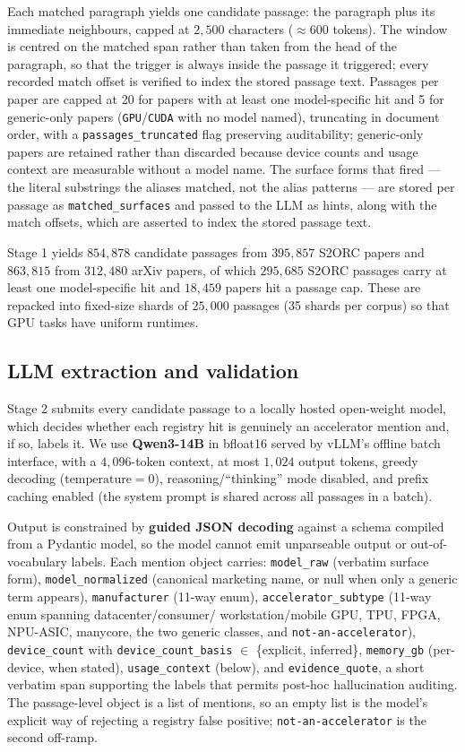 Each matched paragraph yields one candidate passage: the paragraph plus its
immediate neighbours, capped at $2{,}500$ characters ($\approx 600$ tokens). The
window is centred on the matched span rather than taken from the head of the
paragraph, so that the trigger is always inside the passage it triggered; every
recorded match offset is verified to index the stored passage text. Passages per
paper are capped at 20 for papers with at least one model-specific hit and 5 for
generic-only papers (\texttt{GPU}/\texttt{CUDA} with no model named), truncating
in document order, with a
\texttt{passages\_truncated} flag preserving auditability; generic-only papers
are retained rather than discarded because device counts and usage context are
measurable without a model name. The surface forms that fired --- the literal
substrings the aliases matched, not the alias patterns --- are stored per passage
as \texttt{matched\_surfaces} and passed to the LLM as hints, along with the
match offsets, which are asserted to index the stored passage text.

Stage 1 yields $854{,}878$ candidate passages from $395{,}857$ S2ORC papers and
$863{,}815$ from $312{,}480$ arXiv papers, of which $295{,}685$ S2ORC passages
carry at least one model-specific hit and $18{,}459$ papers hit a passage cap.
These are repacked into fixed-size shards of $25{,}000$ passages (35 shards per
corpus) so that GPU tasks have uniform runtimes.

\subsection{LLM extraction and validation}

Stage 2 submits every candidate passage to a locally hosted open-weight model,
which decides whether each registry hit is genuinely an accelerator mention and,
if so, labels it. We use \textbf{Qwen3-14B} in bfloat16 served by vLLM's offline
batch interface, with a $4{,}096$-token context, at most $1{,}024$ output
tokens, greedy decoding ($\text{temperature}=0$), reasoning/``thinking'' mode
disabled, and prefix caching enabled (the system prompt is shared across all
passages in a batch).

Output is constrained by \textbf{guided JSON decoding} against a schema compiled
from a Pydantic model, so the model cannot emit unparseable output or
out-of-vocabulary labels. Each mention object carries: \texttt{model\_raw}
(verbatim surface form), \texttt{model\_normalized} (canonical marketing name,
or null when only a generic term appears), \texttt{manufacturer} (11-way enum),
\texttt{accelerator\_subtype} (11-way enum spanning datacenter/consumer/
workstation/mobile GPU, TPU, FPGA, NPU-ASIC, manycore, the two generic classes,
and \texttt{not-an-accelerator}), \texttt{device\_count} with
\texttt{device\_count\_basis} $\in$ \{explicit, inferred\}, \texttt{memory\_gb}
(per-device, when stated), \texttt{usage\_context} (below), and
\texttt{evidence\_quote}, a short verbatim span supporting the labels that
permits post-hoc hallucination auditing. The passage-level object is a list of
mentions, so an empty list is the model's explicit way of rejecting a registry
false positive; \texttt{not-an-accelerator} is the second off-ramp.

